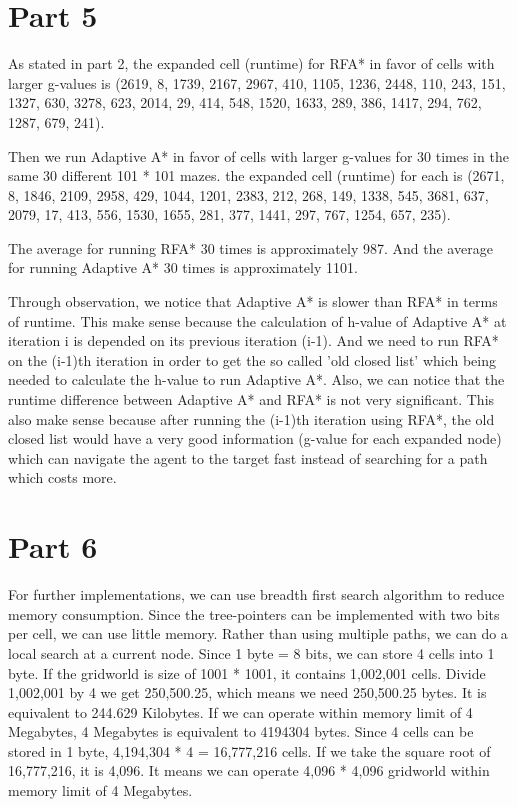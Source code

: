 \documentclass{article}
\begin{document}
\section*{Part 5}
\hspace{5mm}
As stated in part 2, the expanded cell (runtime) for RFA* in favor of cells with larger g-values is
(2619, 8, 1739, 2167, 2967, 410, 1105, 1236, 2448, 110, 243, 151, 1327, 630, 3278, 623, 2014, 29, 414, 548, 1520, 1633, 289, 386, 1417, 294, 762, 1287, 679, 241).

Then we run Adaptive A* in favor of cells with larger g-values for 30 times in the same 30 different 101 * 101 mazes. the expanded cell (runtime) for each is
(2671, 8, 1846, 2109, 2958, 429, 1044, 1201, 2383, 212, 268, 149, 1338, 545, 3681, 637, 2079, 17, 413, 556, 1530, 1655, 281, 377, 1441, 297, 767, 1254, 657, 235).

The average for running RFA* 30 times is approximately 987. And the average for running Adaptive A* 30 times is approximately 1101.

Through observation, we notice that Adaptive A* is slower than RFA* in terms of runtime. This make sense because the calculation of h-value of Adaptive A* at iteration i is depended on its previous iteration (i-1). And we need to run RFA* on the (i-1)th iteration in order to get the so called 'old closed list' which being needed to calculate the h-value to run Adaptive A*. Also, we can notice that the runtime difference between Adaptive A* and RFA* is not very significant. This also make sense because after running the (i-1)th iteration using RFA*, the old closed list would have a very good information (g-value for each expanded node) which can navigate the agent to the target fast instead of searching for a path which costs more.

\section*{Part 6}
\hspace{5mm}
For further implementations, we can use breadth first search algorithm to reduce memory consumption. Since the tree-pointers can be implemented with two bits per cell, we can use little memory.  Rather than using multiple paths, we can do a local search at a current node. Since 1 byte = 8 bits, we can store 4 cells into 1 byte. If the gridworld is size of 1001 * 1001, it contains 1,002,001 cells. Divide 1,002,001 by 4 we get 250,500.25, which means we need 250,500.25 bytes. It is equivalent to 244.629 Kilobytes. If we can operate within memory limit of 4 Megabytes, 4 Megabytes is equivalent to 4194304 bytes. Since 4 cells can be stored in 1 byte, 4,194,304 * 4 = 16,777,216 cells. If we take the square root of 16,777,216, it is 4,096. It means we can operate 4,096 * 4,096 gridworld within memory limit of 4 Megabytes.
\end{document}
